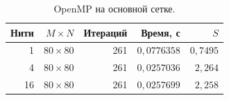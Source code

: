 \begin{table}[H]
\centering\small
\caption{OpenMP на основной сетке.}
\begin{tabular}{rrrrr}
\toprule
Нити & $M\times N$ & Итераций & Время, с & $S$ \\
\midrule
1 & $80\times80$ & 261 & $0{,}0776358$ & $0{,}7495$ \\
4 & $80\times80$ & 261 & $0{,}0257036$ & $2{,}264$ \\
16 & $80\times80$ & 261 & $0{,}0257699$ & $2{,}258$ \\
\bottomrule
\end{tabular}
\end{table}
